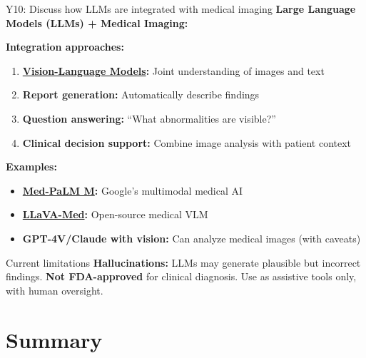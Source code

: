 \documentclass[aspectratio=169, 10pt]{beamer}
\begin{document}
\begin{frame}{Y10: Discuss how LLMs are integrated with medical imaging}
    \textbf{Large Language Models (LLMs) + Medical Imaging:}
    
    \vspace{0.2cm}
    \textbf{Integration approaches:}
    \begin{enumerate}
        \item \textbf{\href{https://en.wikipedia.org/wiki/Vision-language_model}{Vision-Language Models}:} Joint understanding of images and text
        \item \textbf{Report generation:} Automatically describe findings
        \item \textbf{Question answering:} ``What abnormalities are visible?''
        \item \textbf{Clinical decision support:} Combine image analysis with patient context
    \end{enumerate}
    
    \vspace{0.2cm}
    \textbf{Examples:}
    \begin{itemize}
        \item \textbf{\href{https://arxiv.org/abs/2306.00890}{Med-PaLM M}:} Google's multimodal medical AI
        \item \textbf{\href{https://arxiv.org/abs/2303.04048}{LLaVA-Med}:} Open-source medical VLM
        \item \textbf{GPT-4V/Claude with vision:} Can analyze medical images (with caveats)
    \end{itemize}
    
    {\small
    \begin{alertblock}{Current limitations}
        \textbf{Hallucinations:} LLMs may generate plausible but incorrect findings. \textbf{Not FDA-approved} for clinical diagnosis. Use as assistive tools only, with human oversight.
    \end{alertblock}
    }
\end{frame}

\section*{Summary}
\end{document}
